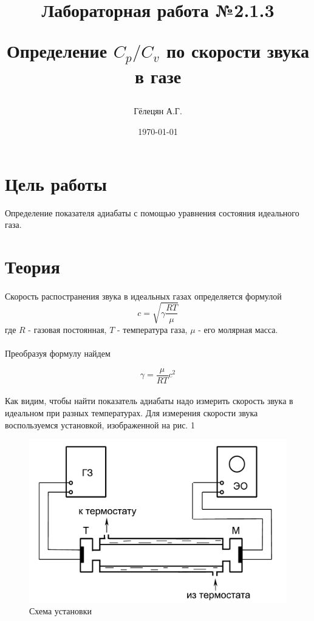 \documentclass[a4paper, 12pt]{article}
\title{\begin{center}Лабораторная работа №2.1.3\end{center}
Определение $C_p/C_v$ по скорости звука в газе}
\author{Гёлецян А.Г.}
\date{\today}
\begin{document}
    \maketitle
    \newpage

    \section{Цель работы}
    Определение показателя адиабаты с помощью уравнения состояния идеального газа.

    \section{Теория}
    \paragraph{}
    Скорость распостранения звука в идеальных газах определяется формулой
    \[c=\sqrt{\gamma\frac{RT}{\mu}}\]
    где $R$ - газовая постоянная, $T$ - температура газа, $\mu$ - его молярная масса.
    \paragraph{}
    Преобразуя формулу найдем

    \begin{equation}
        \gamma=\frac{\mu}{RT}c^2
    \end{equation}

    \paragraph{}
    Как видим, чтобы найти показатель адиабаты надо измерить скорость звука в идеальном при разных температурах. Для измерения скорости звука воспользуемся установкой, изображенной на рис. 1
    \begin{figure}[h]
        \begin{center}
            \includegraphics[width=0.8\linewidth]{ustanovka}
            \caption{Схема установки}
        \end{center}
    \end{figure}
\end{document}
